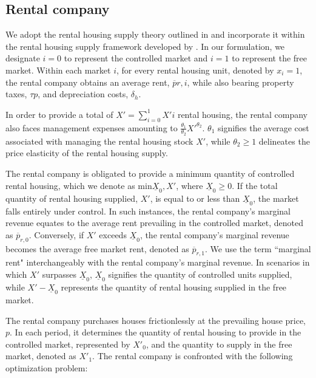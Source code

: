 \documentclass[parskip=full]{article}
\begin{document}
\subsection{Rental company}\label{sec:rental_company}

We adopt the rental housing supply theory outlined in \citet{fallis-1985} and incorporate it within the rental housing supply framework developed by \citet{garrigaeetal-2009}. In our formulation, we designate $i=0$ to represent the controlled market and $i=1$ to represent the free market. Within each market $i$, for every rental housing unit, denoted by $x_i = 1$, the rental company obtains an average rent, $\overline{p}{r,i}$, while also bearing property taxes, $\tau{p}$, and depreciation costs, $\delta_{h}$.

In order to provide a total of $X'=\sum^{1}_{i=0} X'{i}$ rental housing, the rental company also faces management expenses amounting to $\frac{\theta_{1}}{\theta_{2}}X'^{\theta_{2}}$. $\theta_{1}$ signifies the average cost associated with managing the rental housing stock $X'$, while $\theta_{2}\geq 1$ delineates the price elasticity of the rental housing supply.

The rental company is obligated to provide a minimum quantity of controlled rental housing, which we denote as $\mbox{min}{\underline{X}_{0},X'}$, where $\underline{X}_{0} \geq 0$. If the total quantity of rental housing supplied, $X'$, is equal to or less than $\underline{X}_{0}$, the market falls entirely under control. In such instances, the rental company's marginal revenue equates to the average rent prevailing in the controlled market, denoted as $\overline{p}_{r,0}$. Conversely, if $X'$ exceeds $\underline{X}_{0}$, the rental company's marginal revenue becomes the average free market rent, denoted as $\overline{p}_{r,1}$. We use the term ``marginal rent" interchangeably with the rental company's marginal revenue. In scenarios in which $X'$ surpasses $\underline{X}_{0}$, $\underline{X}_{0}$ signifies the quantity of controlled units supplied, while $X' - \underline{X}_{0}$ represents the quantity of rental housing supplied in the free market.

The rental company purchases houses frictionlessly at the prevailing house price, $p$. In each period, it determines the quantity of rental housing to provide in the controlled market, represented by $X'_{0}$, and the quantity to supply in the free market, denoted as $X'_{1}$. The rental company is confronted with the following optimization problem:
\end{document}

